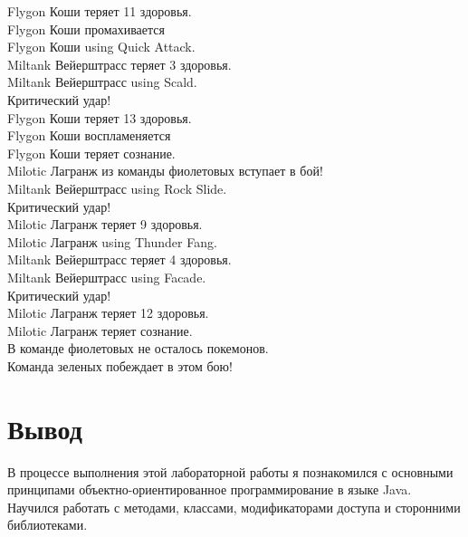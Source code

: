 \documentclass[12pt,onecolumn]{article}
\begin{document}
{Flygon Коши теряет 11 здоровья.\\
\hfill \break
Flygon Коши промахивается\\
\hfill \break
Flygon Коши using Quick Attack. \\
Miltank Вейерштрасс теряет 3 здоровья.\\
\hfill \break
Miltank Вейерштрасс using Scald. \\
Критический удар!\\
Flygon Коши теряет 13 здоровья.\\
Flygon Коши воспламеняется\\
Flygon Коши теряет сознание.\\
Milotic Лагранж из команды фиолетовых вступает в бой!\\
Miltank Вейерштрасс using Rock Slide. \\
Критический удар!\\
Milotic Лагранж теряет 9 здоровья.\\
\hfill \break
Milotic Лагранж using Thunder Fang. \\
Miltank Вейерштрасс теряет 4 здоровья.\\
\hfill \break
Miltank Вейерштрасс using Facade. \\
Критический удар!\\
Milotic Лагранж теряет 12 здоровья.\\
Milotic Лагранж теряет сознание.\\
В команде фиолетовых не осталось покемонов.\\
Команда зеленых побеждает в этом бою!\\
}
\section{Вывод}
\normalsize
В процессе выполнения этой лабораторной работы я познакомился с основными принципами объектно-ориентированное программирование в языке Java.
Научился работать с методами, классами, модификаторами доступа и сторонними библиотеками.
\end{document}
